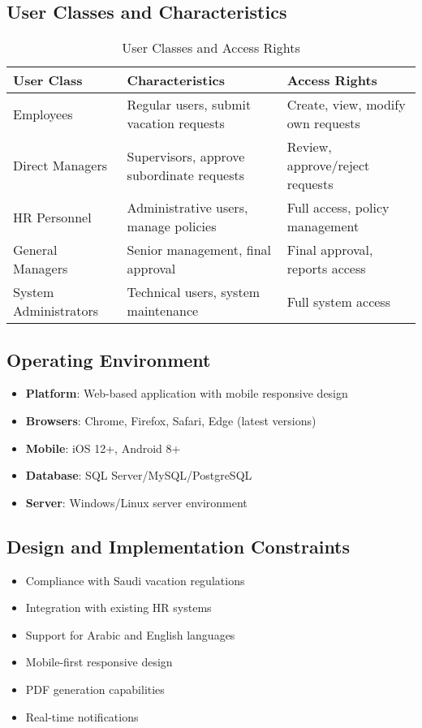 \documentclass[12pt,a4paper]{article}
\begin{document}
\subsection{User Classes and Characteristics}
\begin{table}[H]
\centering
\begin{tabular}{|p{3cm}|p{4cm}|p{4cm}|}
\hline
\textbf{User Class} & \textbf{Characteristics} & \textbf{Access Rights} \\
\hline
Employees & Regular users, submit vacation requests & Create, view, modify own requests \\
\hline
Direct Managers & Supervisors, approve subordinate requests & Review, approve/reject requests \\
\hline
HR Personnel & Administrative users, manage policies & Full access, policy management \\
\hline
General Managers & Senior management, final approval & Final approval, reports access \\
\hline
System Administrators & Technical users, system maintenance & Full system access \\
\hline
\end{tabular}
\caption{User Classes and Access Rights}
\end{table}

\subsection{Operating Environment}
\begin{itemize}
    \item \textbf{Platform}: Web-based application with mobile responsive design
    \item \textbf{Browsers}: Chrome, Firefox, Safari, Edge (latest versions)
    \item \textbf{Mobile}: iOS 12+, Android 8+
    \item \textbf{Database}: SQL Server/MySQL/PostgreSQL
    \item \textbf{Server}: Windows/Linux server environment
\end{itemize}

\subsection{Design and Implementation Constraints}
\begin{itemize}
    \item Compliance with Saudi vacation regulations
    \item Integration with existing HR systems
    \item Support for Arabic and English languages
    \item Mobile-first responsive design
    \item PDF generation capabilities
    \item Real-time notifications
\end{itemize}
\end{document}
